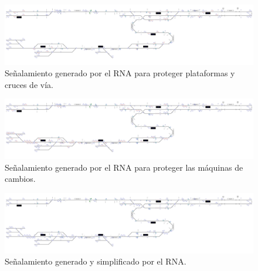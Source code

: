     \begin{figure}[h]
        \centering
        \includegraphics[width=1\textwidth]{resultados-obtenidos/ejemplo3/images/3_step3.png}
        \centering\caption{Señalamiento generado por el RNA para proteger plataformas y cruces de vía.}
    \end{figure}

    \begin{figure}[h]
        \centering
        \includegraphics[width=1\textwidth]{resultados-obtenidos/ejemplo3/images/3_step4.png}
        \centering\caption{Señalamiento generado por el RNA para proteger las máquinas de cambios.}
    \end{figure}

    \begin{figure}[h]
        \centering
        \includegraphics[width=1\textwidth]{resultados-obtenidos/ejemplo3/images/3_RNA.png}
        \centering\caption{Señalamiento generado y simplificado por el RNA.}
    \end{figure}

    
    
    
    